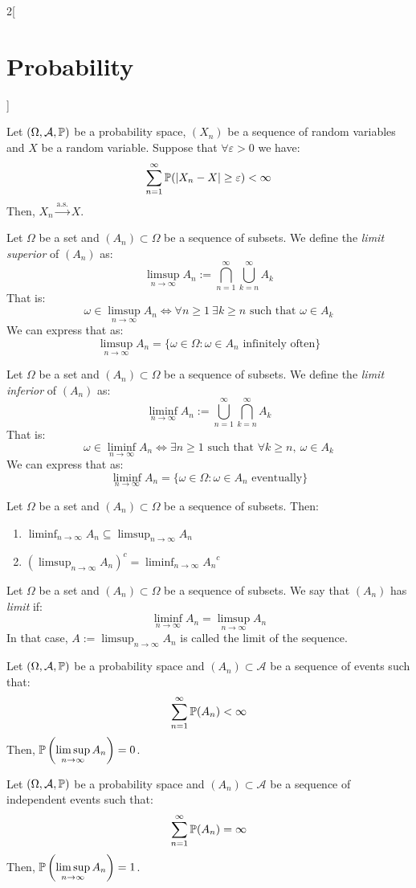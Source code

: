 \documentclass[../../../main.tex]{subfiles}
\begin{document}
\begin{multicols}{2}[\section{Probability}]
\begin{proposition}
  \end{proposition}
  \begin{proposition}
    Let $(\Omega,\mathcal{A},\mathbb{P})$ be a probability space, $(X_n)$ be a sequence of random variables and $X$ be a random variable. Suppose that $\forall\varepsilon >0$ we have: $$\sum_{n=1}^\infty\mathbb{P}(|X_n-X|\geq\varepsilon)<\infty$$
    Then, $X_n\overset{\text{a.s.}}{\longrightarrow} X$.
  \end{proposition}
  \begin{definition}
    Let $\Omega$ be a set and $(A_n)\subset\Omega$ be a sequence of subsets. We define the \emph{limit superior} of $(A_n)$ as: $$\limsup_{n\to\infty}A_n:=\bigcap_{n=1}^\infty\bigcup_{k=n}^\infty A_k$$
    That is: $$\omega\in\limsup_{n\to\infty}A_n\iff\forall n\geq 1\ \exists k\geq n\text{ such that }\omega\in A_k$$ We can express that as:
    $$\limsup_{n\to\infty}A_n=\{\omega\in\Omega:\omega\in A_n\text{ infinitely often}\}$$
  \end{definition}
  \begin{definition}
    Let $\Omega$ be a set and $(A_n)\subset\Omega$ be a sequence of subsets. We define the \emph{limit inferior} of $(A_n)$ as: $$\liminf_{n\to\infty}A_n:=\bigcup_{n=1}^\infty\bigcap_{k=n}^\infty A_k$$
    That is: $$\omega\in\liminf_{n\to\infty}A_n\iff\exists n\geq 1\text{ such that }\forall k\geq n,\ \omega\in A_k$$ We can express that as:
    $$\liminf_{n\to\infty}A_n=\{\omega\in\Omega:\omega\in A_n\text{ eventually}\}$$
  \end{definition}
  \begin{proposition}
    Let $\Omega$ be a set and $(A_n)\subset\Omega$ be a sequence of subsets. Then:
    \begin{enumerate}
      \item $\displaystyle\liminf_{n\to\infty}A_n\subseteq\limsup_{n\to\infty}A_n$
      \item $\displaystyle{\left(\limsup_{n\to\infty}A_n\right)}^c=\liminf_{n\to\infty}{A_n}^c$
    \end{enumerate}
  \end{proposition}
  \begin{definition}
    Let $\Omega$ be a set and $(A_n)\subset\Omega$ be a sequence of subsets. We say that $(A_n)$ has \emph{limit} if: $$\liminf_{n\to\infty}A_n=\limsup_{n\to\infty}A_n$$
    In that case, $\displaystyle A:=\limsup_{n\to\infty}A_n$ is called the limit of the sequence.
  \end{definition}
  \begin{lemma}
    Let $(\Omega,\mathcal{A},\mathbb{P})$ be a probability space and $(A_n)\subset\mathcal{A}$ be a sequence of events such that: $$\sum_{n=1}^\infty\mathbb{P}(A_n)<\infty$$
    Then, $\displaystyle\mathbb{P}\left(\limsup_{n\to\infty} A_n\right)=0$.
  \end{lemma}
  \begin{lemma}
    Let $(\Omega,\mathcal{A},\mathbb{P})$ be a probability space and $(A_n)\subset\mathcal{A}$ be a sequence of independent events such that: $$\sum_{n=1}^\infty\mathbb{P}(A_n)=\infty$$
    Then, $\displaystyle\mathbb{P}\left(\limsup_{n\to\infty} A_n\right)=1$.
  \end{lemma}

\end{multicols}
\end{document}
